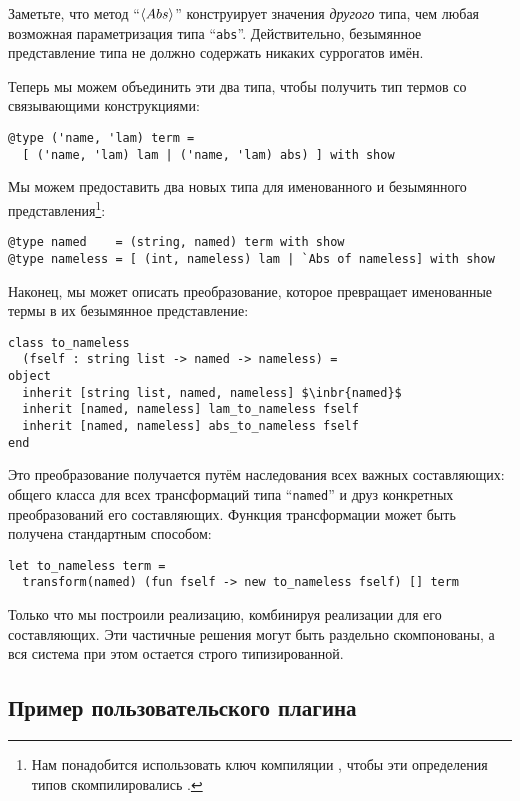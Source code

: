 Заметьте, что метод ``$\left<Abs\right>$'' конструирует значения \emph{другого} типа, чем любая возможная параметризация типа ``\lstinline{abs}''. Действительно, безымянное представление типа не должно содержать никаких суррогатов имён.

Теперь мы можем объединить эти два типа, чтобы получить тип термов со связывающими конструкциями:

\begin{lstlisting}
@type ('name, 'lam) term = 
  [ ('name, 'lam) lam | ('name, 'lam) abs) ] with show
\end{lstlisting}

Мы можем предоставить два новых типа для именованного и безымянного представления\footnote{Нам понадобится использовать ключ компиляции
, чтобы эти определения типов скомпилировались .}:

\begin{lstlisting}
@type named    = (string, named) term with show
@type nameless = [ (int, nameless) lam | `Abs of nameless] with show
\end{lstlisting}

Наконец, мы может описать преобразование, которое превращает именованные термы в их безымянное представление:

\begin{lstlisting}
class to_nameless
  (fself : string list -> named -> nameless) =
object
  inherit [string list, named, nameless] $\inbr{named}$
  inherit [named, nameless] lam_to_nameless fself
  inherit [named, nameless] abs_to_nameless fself
end
\end{lstlisting}

Это преобразование получается путём наследования всех важных составляющих: общего класса для всех трансформаций типа ``\lstinline{named}'' 
и друз конкретных преобразований его составляющих. Функция трансформации может быть получена стандартным способом:

\begin{lstlisting}
let to_nameless term =
  transform(named) (fun fself -> new to_nameless fself) [] term
\end{lstlisting}

Только что мы построили реализацию, комбинируя реализации для его составляющих. Эти частичные решения могут быть раздельно скомпонованы, а вся система при этом остается строго типизированной.

\subsection{Пример пользовательского плагина}
\label{pluginExample}


